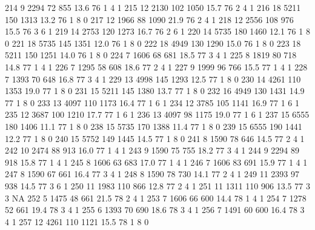 \documentclass{article}
\begin{document}
\begin{Schunk}
\begin{Soutput}
214       9  2294  72  855 13.6  76      1       4        1
215      12  2130 102 1050 15.7  76      2       4        1
216      18  5211 150 1313 13.2  76      1       8        0
217      12  1966  88 1090 21.9  76      2       4        1
218      12  2556 108  976 15.5  76      3       6        1
219      14  2753 120 1273 16.7  76      2       6        1
220      14  5735 180 1460 12.1  76      1       8        0
221      18  5735 145 1351 12.0  76      1       8        0
222      18  4949 130 1290 15.0  76      1       8        0
223      18  5211 150 1251 14.0  76      1       8        0
224       7  1606  68  681 18.5  77      3       4        1
225       8  1819  80  718 14.8  77      1       4        1
226       7  1295  58  608 18.6  77      2       4        1
227       9  1999  96  766 15.5  77      1       4        1
228       7  1393  70  648 16.8  77      3       4        1
229      13  4998 145 1293 12.5  77      1       8        0
230      14  4261 110 1353 19.0  77      1       8        0
231      15  5211 145 1380 13.7  77      1       8        0
232      16  4949 130 1431 14.9  77      1       8        0
233      13  4097 110 1173 16.4  77      1       6        1
234      12  3785 105 1141 16.9  77      1       6        1
235      12  3687 100 1210 17.7  77      1       6        1
236      13  4097  98 1175 19.0  77      1       6        1
237      15  6555 180 1406 11.1  77      1       8        0
238      15  5735 170 1388 11.4  77      1       8        0
239      15  6555 190 1441 12.2  77      1       8        0
240      15  5752 149 1445 14.5  77      1       8        0
241       8  1590  78  646 14.5  77      2       4        1
242      10  2474  88  913 16.0  77      1       4        1
243       9  1590  75  755 18.2  77      3       4        1
244       9  2294  89  918 15.8  77      1       4        1
245       8  1606  63  683 17.0  77      1       4        1
246       7  1606  83  691 15.9  77      1       4        1
247       8  1590  67  661 16.4  77      3       4        1
248       8  1590  78  730 14.1  77      2       4        1
249      11  2393  97  938 14.5  77      3       6        1
250      11  1983 110  866 12.8  77      2       4        1
251      11  1311 110  906 13.5  77      3       3       NA
252       5  1475  48  661 21.5  78      2       4        1
253       7  1606  66  600 14.4  78      1       4        1
254       7  1278  52  661 19.4  78      3       4        1
255       6  1393  70  690 18.6  78      3       4        1
256       7  1491  60  600 16.4  78      3       4        1
257      12  4261 110 1121 15.5  78      1       8        0

\end{Soutput}
\end{Schunk}
\end{document}
